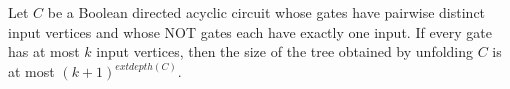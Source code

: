 \begin{theorem}
\label{BoolCircuit.DAGCircuit.toTree_size_le}
\leanok
{}
Let $C$ be a Boolean directed acyclic circuit whose gates have pairwise distinct input
vertices and whose NOT gates each have exactly one input. If every gate has at most $k$
input vertices, then the size of the tree obtained by unfolding $C$ is at most
$(k+1)^{	ext{depth}(C)}$.
\end{theorem}
